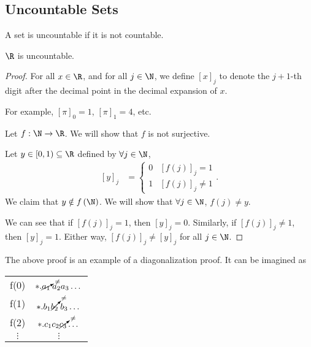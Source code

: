 \documentclass[10pt]{mypackage}
\begin{document}
\subsection{Uncountable Sets}%
\begin{definition}
A set is uncountable if it is not countable.
\end{definition}
\begin{theorem}[Uncountability of $\R$]
  $\R$ is uncountable.
\end{theorem}
\begin{proof}
  For all $x\in \R$, and for all $j\in\N$, we define $\left[x\right]_j$ to denote the $j+1$-th digit after the decimal point in the decimal expansion of $x$.\newline

  For example, $\left[\pi\right]_0 = 1$, $\left[\pi\right]_1 = 4$, etc.\newline

  Let $f: \N\rightarrow \R$. We will show that $f$ is not surjective.\newline

  Let $y\in [0,1)\subseteq \R$ defined by $\forall j\in \N$,
  \begin{align*}
    \left[y\right]_j &= \begin{cases}
      0 & \left[f(j)\right]_j = 1\\
      1 & \left[f(j)\right]_j \neq 1
    \end{cases}.
  \end{align*}
  We claim that $y\notin f\left(\N\right)$. We will show that $\forall j\in \N$, $f(j) \neq y$.\newline

  We can see that if $\left[f(j)\right]_j = 1$, then $\left[y\right]_j = 0$. Similarly, if $\left[f(j)\right]_j\neq 1$, then $\left[y\right]_j = 1$. Either way, $\left[f(j)\right]_j \neq \left[y\right]_j$ for all $j\in\N$.
\end{proof}
\begin{remark}
The above proof is an example of a diagonalization proof. It can be imagined as
\begin{center}
  \renewcommand{\arraystretch}{1.5}
  \begin{tabular}{c|c}
    f(0) & $\ast.\cancelto{\neq}{a_1}\:a_2a_3\dots$\\
    f(1) & $\ast.b_1\cancelto{\neq}{b_2}\:b_3\dots$\\
    f(2) & $\ast.c_1c_2\cancelto{\neq}{c_3}\dots$\\
    $\vdots$ & $\vdots$
  \end{tabular}
\end{center}
\end{remark}
\end{document}
